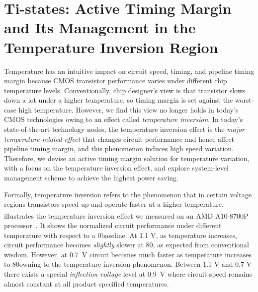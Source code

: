 
\chapter{Ti-states: Active Timing Margin and Its Management in the Temperature Inversion Region}
\label{sec:temperature}

Temperature has an intuitive impact on circuit speed, timing, and pipeline timing margin because CMOS transistor performance varies under different chip temperature levels. Conventionally, chip designer's view is that transistor slows down a lot under a higher temperature, so timing margin is set against the worst-case high temperature. However, we find this view no longer holds in today's CMOS technologies owing to an effect called \textit{temperature inversion}. In today's state-of-the-art technology nodes, the temperature inversion effect is the \textit{major temperature-related effect} that changes circuit performance and hence affect pipeline timing margin, and this phenomenon induces high speed variation. Therefore, we devise an active timing margin solution for temperature variation, with a focus on the temperature inversion effect, and explore system-level management scheme to achieve the highest power saving.

Formally, temperature inversion refers to the phenomenon that in certain voltage regions transistors speed up and operate faster at a higher temperature.  illustrates the temperature inversion effect we measured on an AMD\textsuperscript{\textregistered} A10-8700P processor~\cite{munger2016carrizo}. It shows the normalized circuit performance under different temperature with respect to a 0\C baseline. At 1.1 V, as temperature increases, circuit performance becomes \textit{slightly} slower at 80\C, as expected from conventional wisdom. However, at 0.7~V circuit becomes much faster as temperature increases to 80\C owning to the temperature inversion phenomenon. Between 1.1 V and 0.7 V there exists a special {\it inflection voltage} level at 0.9~V where circuit speed remains almost constant at all product specified temperatures. 

